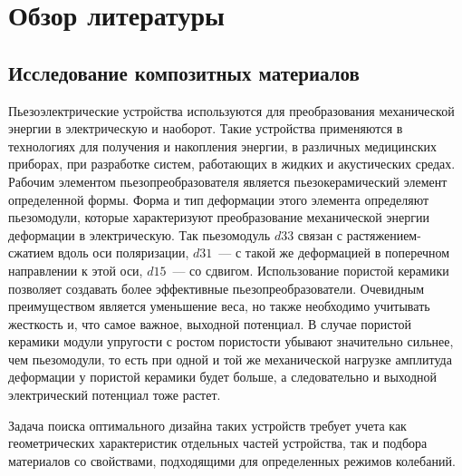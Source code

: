 \chapter{Обзор литературы}\label{ch:ch1}

\section{Исследование композитных материалов}\label{sec:ch1/sec1}

Пьезоэлектрические устройства используются для преобразования механической энергии в электрическую и наоборот. Такие устройства применяются в технологиях для получения и накопления энергии, в различных медицинских приборах, при разработке систем, работающих в жидких и акустических средах. Рабочим элементом пьезопреобразователя является пьезокерамический элемент определенной формы. Форма и тип деформации этого элемента определяют пьезомодули, которые характеризуют преобразование механической энергии деформации в электрическую. Так пьезомодуль $d33$ связан с растяжением-сжатием вдоль оси поляризации, $d31$~--- с такой же деформацией в поперечном направлении к этой оси, $d15$~--- со сдвигом. Использование пористой керамики позволяет создавать более эффективные пьезопреобразователи. Очевидным преимуществом является уменьшение веса, но также необходимо учитывать жесткость и, что самое важное, выходной потенциал. В случае пористой керамики модули упругости с ростом пористости убывают значительно сильнее, чем пьезомодули, то есть при одной и той же механической нагрузке амплитуда деформации у пористой керамики будет больше, а следовательно и выходной электрический потенциал тоже  растет. 

Задача поиска оптимального дизайна таких устройств требует учета как геометрических характеристик отдельных частей устройства, так и подбора материалов со свойствами, подходящими для определенных режимов колебаний.

